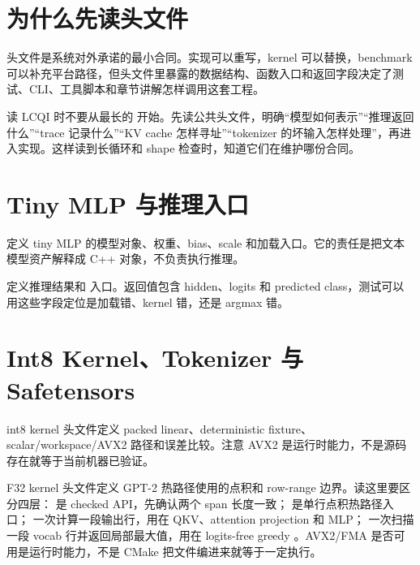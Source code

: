 \section{为什么先读头文件}

头文件是系统对外承诺的最小合同。实现可以重写，kernel 可以替换，benchmark 可以补充平台路径，但头文件里暴露的数据结构、函数入口和返回字段决定了测试、CLI、工具脚本和章节讲解怎样调用这套工程。

\begin{keyidea}
读 LCQI 时不要从最长的  开始。先读公共头文件，明确“模型如何表示”“推理返回什么”“trace 记录什么”“KV cache 怎样寻址”“tokenizer 的坏输入怎样处理”，再进入实现。这样读到长循环和 shape 检查时，知道它们在维护哪份合同。
\end{keyidea}

\section{Tiny MLP 与推理入口}

 定义 tiny MLP 的模型对象、权重、bias、scale 和加载入口。它的责任是把文本模型资产解释成 C++ 对象，不负责执行推理。



 定义推理结果和  入口。返回值包含 hidden、logits 和 predicted class，测试可以用这些字段定位是加载错、kernel 错，还是 argmax 错。



\section{Int8 Kernel、Tokenizer 与 Safetensors}

int8 kernel 头文件定义 packed linear、deterministic fixture、scalar/workspace/AVX2 路径和误差比较。注意 AVX2 是运行时能力，不是源码存在就等于当前机器已验证。



F32 kernel 头文件定义 GPT-2 热路径使用的点积和 row-range 边界。读这里要区分四层： 是 checked API，先确认两个 span 长度一致； 是单行点积热路径入口； 一次计算一段输出行，用在 QKV、attention projection 和 MLP； 一次扫描一段 vocab 行并返回局部最大值，用在 logits-free greedy 。AVX2/FMA 是否可用是运行时能力，不是 CMake 把文件编进来就等于一定执行。

